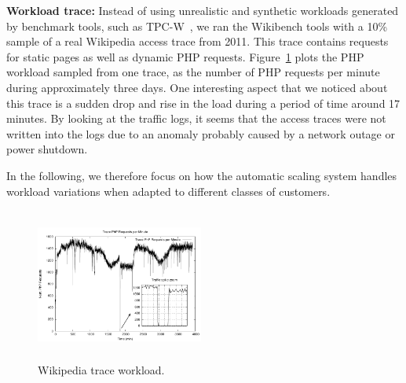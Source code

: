 




\textbf{Workload trace:}  Instead of using unrealistic and synthetic workloads generated by benchmark tools, such as TPC-W~\cite{TPC-W}, we ran the Wikibench tools with a 10\% sample of a real Wikipedia access trace from 2011.  This trace contains requests for static pages as well as dynamic PHP requests. Figure~\ref{workload} plots the PHP workload sampled from one trace, as the number of PHP requests per minute during approximately three days. One interesting aspect that we noticed about this trace is a sudden drop and rise in the load during a period of time around 17 minutes. By looking at the traffic logs, it seems that the access traces were not written into the logs due to an anomaly probably caused by a network outage or power shutdown. 


In the following, we therefore focus on how the automatic scaling system handles workload variations when adapted to different classes of customers. 


\begin{figure}
\begin{center}
\includegraphics[width=0.49\textwidth, height=5cm]{./images/traceWorkload_zoom}
\end{center}
\vspace{-3mm}
\caption{Wikipedia trace workload.}
\label{workload}
\end{figure}





